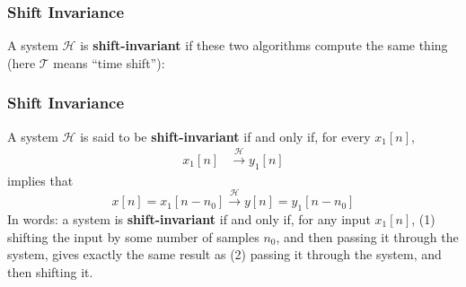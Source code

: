 \documentclass{beamer}
\begin{document}
\begin{frame}
  \frametitle{Shift Invariance}

  A system ${\mathcal H}$ is {\bf shift-invariant} if these two
  algorithms compute the same thing (here ${\mathcal T}$ means ``time
  shift''):
  
  \begin{center}
  \end{center}
  \begin{center}
  \end{center}
\end{frame}


\begin{frame}
  \frametitle{Shift Invariance}

  A system ${\mathcal H}$ is said to be {\bf shift-invariant} if and
  only if, for every $x_1[n]$,
  \begin{align*}
    x_1[n] &\stackrel{\mathcal H}{\longrightarrow} y_1[n]
  \end{align*}
  implies that
  \[
  x[n]=x_1[n-n_0] \stackrel{\mathcal H}{\longrightarrow} y[n]=y_1[n-n_0]
  \]
  In words: a system is {\bf shift-invariant} if and only if, for any
  input $x_1[n]$, (1) shifting the input by some number of samples
  $n_0$, and then passing it through the system, gives exactly the
  same result as (2) passing it through the system, and then shifting
  it.
\end{frame}
\end{document}
